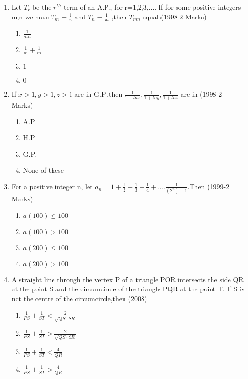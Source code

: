 \documentclass[journal,12pt,twocolumn]{IEEEtran}
\theoremstyle{remark}
\begin{document}
\begin{enumerate}
\item Let $T_r$ be the $r^{th}$ term of an A.P., for r=1,2,3,.... If for some positive integers m,n we have
$T_m=\frac{1}{n}$ and $T_n=\frac{1}{m}$ ,then $T_{mn}$ equals\hfill{(1998-2 Marks)}
\begin{multicols}{2}
\begin{enumerate}
\item $\frac{1}{mn}$
\item $\frac{1}{m} + \frac{1}{m}$
\item $1$
\item $0$
\end{enumerate}
\end{multicols}

\item If $x>1,y>1,z>1$ are in G.P.,then $\frac{1}{1+lnx},\frac{1}{1+lny},\frac{1}{1+lnz}$ are in 
\hfill{(1998-2 Marks)}
\begin{multicols}{2}
\begin{enumerate}
\item A.P.
\item H.P.
\item G.P.
\item None of these
\end{enumerate}
\end{multicols}

\item For a positive integer n, let
$a_n=1+\frac{1}{2}+\frac{1}{3}+\frac{1}{4}+....\frac{1}{(2^n)-1}$.Then \hfill{(1999-2 Marks)}
\begin{multicols}{2}
\begin{enumerate}
\item $a(100)\leq 100$
\item $a(100) > 100$
\item $a(200)\leq 100$
\item $a(200) > 100$
\end{enumerate}
\end{multicols}

\item A straight line through the vertex P of a triangle POR intersects the side QR at the point S and the circumcircle of the triangle PQR at the point T. If S is not the centre of the circumcircle,then  \hfill{(2008)}
\begin{multicols}{2}
\begin{enumerate}
\item $\frac{1}{PS}+\frac{1}{ST}<\frac{2}{\sqrt{QS \cdot SR}}$
\item $\frac{1}{PS}+\frac{1}{ST}>\frac{2}{\sqrt{QS \cdot SR}}$
\item $\frac{1}{PS}+\frac{1}{ST}<\frac{4}{QR}$
\item $\frac{1}{PS}+\frac{1}{ST}>\frac{4}{QR}$
\end{enumerate}
\end{multicols}


\end{enumerate}
\end{document}
